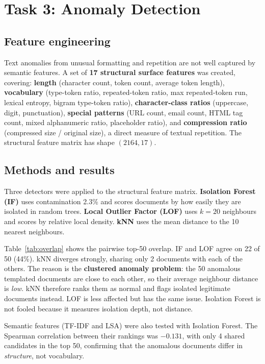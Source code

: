 \documentclass[11pt,a4paper]{article}
\begin{document}
\section{Task 3: Anomaly Detection}
\label{sec:task3}

\subsection{Feature engineering}

Text anomalies from unusual formatting and repetition are not well captured by semantic features. A set of \textbf{17 structural surface features} was created, covering: \textbf{length} (character count, token count, average token length), \textbf{vocabulary} (type-token ratio, repeated-token ratio, max repeated-token run, lexical entropy, bigram type-token ratio), \textbf{character-class ratios} (uppercase, digit, punctuation), \textbf{special patterns} (URL count, email count, HTML tag count, mixed alphanumeric ratio, placeholder ratio), and \textbf{compression ratio} (compressed size / original size), a direct measure of textual repetition. The structural feature matrix has shape $(2164, 17)$.

\subsection{Methods and results}

Three detectors were applied to the structural feature matrix. \textbf{Isolation Forest (IF)} uses contamination 2.3\% and scores documents by how easily they are isolated in random trees. \textbf{Local Outlier Factor (LOF)} uses $k=20$ neighbours and scores by relative local density. \textbf{kNN} uses the mean distance to the 10 nearest neighbours.

Table~\ref{tab:overlap} shows the pairwise top-50 overlap. IF and LOF agree on 22 of 50 (44\%). kNN diverges strongly, sharing only 2 documents with each of the others. The reason is the \textbf{clustered anomaly problem}: the 50 anomalous templated documents are close to each other, so their average neighbour distance is \emph{low}. kNN therefore ranks them as normal and flags isolated legitimate documents instead. LOF is less affected but has the same issue. Isolation Forest is not fooled because it measures isolation depth, not distance.

Semantic features (TF-IDF and LSA) were also tested with Isolation Forest. The Spearman correlation between their rankings was $\mathbf{-0.131}$, with only 4 shared candidates in the top 50, confirming that the anomalous documents differ in \emph{structure}, not vocabulary.
\end{document}
